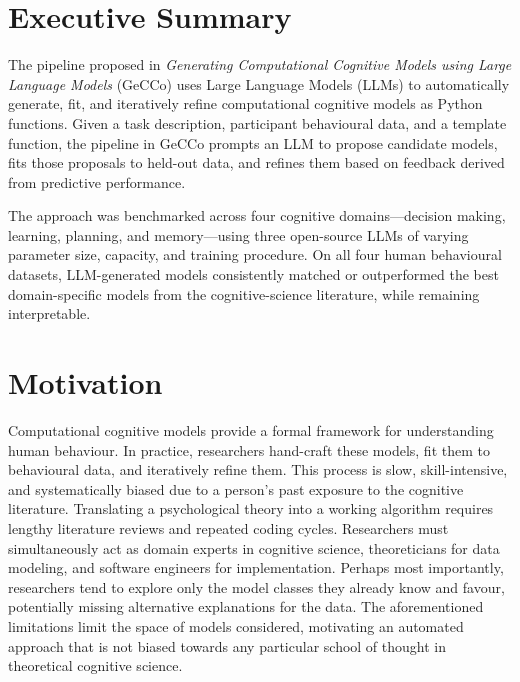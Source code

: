 \author{}
\date{}



\maketitle
\tableofcontents

\section{Executive Summary}

The pipeline proposed in \textit{Generating Computational Cognitive Models
using Large Language Models} (GeCCo) uses Large Language Models (LLMs) to automatically generate, fit, and iteratively refine computational cognitive models as Python functions. Given a task description, participant behavioural data, and a template function, the pipeline in GeCCo prompts an LLM to propose candidate models, fits those proposals to held-out data, and refines them based on feedback derived from predictive performance.

The approach was benchmarked across four cognitive domains---decision making, learning, planning, and memory---using three open-source LLMs of varying parameter size, capacity, and training procedure. On all four human behavioural datasets, LLM-generated models consistently matched or outperformed the best domain-specific models from the cognitive-science literature, while remaining interpretable.

\section{Motivation}

Computational cognitive models provide a formal framework for understanding human behaviour. In practice, researchers hand-craft these models, fit them to behavioural data, and iteratively refine them. This process is slow, skill-intensive, and systematically biased due to a person's past exposure to the cognitive literature. Translating a psychological theory into a working algorithm requires lengthy literature reviews and repeated coding cycles. Researchers must simultaneously act as domain experts in cognitive science, theoreticians for data modeling, and software engineers for implementation. Perhaps most importantly, researchers tend to explore only the model classes they already know and favour, potentially missing alternative explanations for the data. The aforementioned limitations limit the space of models considered, motivating an automated approach that is not biased towards any particular school of thought in theoretical cognitive science.\\

